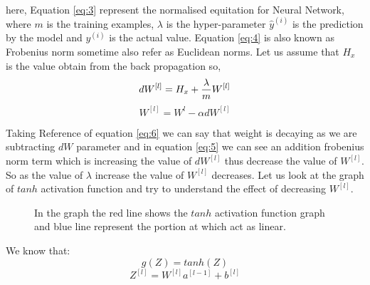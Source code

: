 \documentclass{article}
\begin{document}
\begin{multicols}{2}
\\
here, Equation \ref{eq:3} represent the normalised equitation for Neural Network, where $m$ is the training examples, $\lambda$ is the hyper-parameter  $\hat y^{(i)}$ is the prediction by the model and $y^{(i)}$ is the actual value. Equation \ref{eq:4} is also known as Frobenius norm sometime also refer as Euclidean norms. Let us assume that $H_x$ is the value obtain from the back propagation so,
\begin{equation}
\label{eq:5}
    dW^{[l]} = H_x + {\lambda \over m } W^{[l]}
\end{equation}
\begin{equation}
\label{eq:6}
    W^{[l]} = W^{l} - \alpha dW^{[l]}
\end{equation}

Taking Reference of equation \ref{eq:6} we can say that weight is decaying as we are subtracting $dW$ parameter and in equation \ref{eq:5} we can see an addition frobenius norm term which is increasing the value of $dW^{[l]}$ thus decrease the value of $W^{[l]}$. So as the value of $\lambda$ increase the value of $W^{[l]}$ decreases. Let us look at the graph of $tanh$ activation function and try to understand the effect of decreasing $W^{[l]}$. 

\begin{figure}[H]
\label{fig:3}
    \caption{In the graph the red line shows the $tanh$ activation function graph and blue line represent the portion at which act as linear.}
  \end{figure}
  
 
 We know that:
\begin{equation}
\label{eq:7}
    g(Z) = tanh(Z)
\end{equation}
\begin{equation}
\label{eq:8}
    Z^{[l]} = W^{[l]}a^{[l-1]} + b^{[l]}
\end{equation}


\end{multicols}
\end{document}
